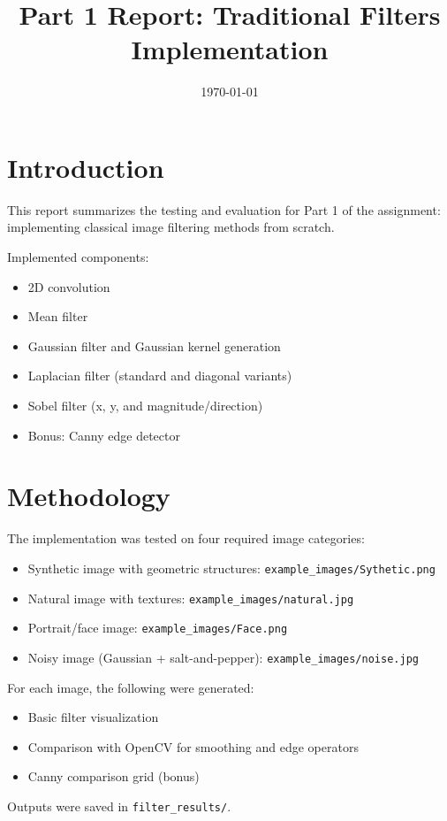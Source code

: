 \documentclass[11pt,a4paper]{article}
\title{Part 1 Report: Traditional Filters Implementation}
\author{}
\date{\today}
\begin{document}
\maketitle

\section{Introduction}
This report summarizes the testing and evaluation for Part 1 of the assignment: implementing classical image filtering methods from scratch.

Implemented components:
\begin{itemize}
    \item 2D convolution
    \item Mean filter
    \item Gaussian filter and Gaussian kernel generation
    \item Laplacian filter (standard and diagonal variants)
    \item Sobel filter (x, y, and magnitude/direction)
    \item Bonus: Canny edge detector
\end{itemize}

\section{Methodology}
The implementation was tested on four required image categories:
\begin{itemize}
    \item Synthetic image with geometric structures: \texttt{example\_images/Sythetic.png}
    \item Natural image with textures: \texttt{example\_images/natural.jpg}
    \item Portrait/face image: \texttt{example\_images/Face.png}
    \item Noisy image (Gaussian + salt-and-pepper): \texttt{example\_images/noise.jpg}
\end{itemize}

For each image, the following were generated:
\begin{itemize}
    \item Basic filter visualization
    \item Comparison with OpenCV for smoothing and edge operators
    \item Canny comparison grid (bonus)
\end{itemize}

Outputs were saved in \texttt{filter\_results/}.
\end{document}
